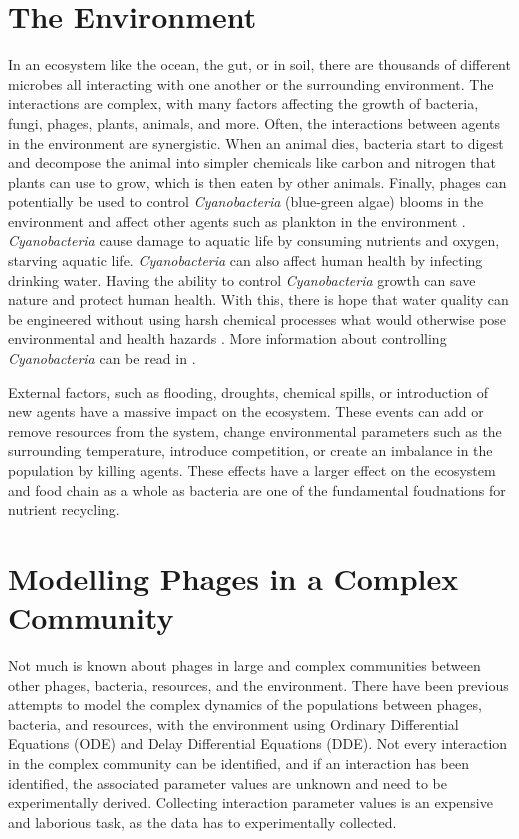 \section{The Environment}
In an ecosystem like the ocean, the gut, or in soil, there are thousands of different microbes all interacting with one another or the surrounding environment.
The interactions are complex, with many factors affecting the growth of bacteria, fungi, phages, plants, animals, and more. 
Often, the interactions between agents in the environment are synergistic. 
When an animal dies, bacteria start to digest and decompose the animal into simpler chemicals like carbon and nitrogen that plants can use to grow, which is then eaten by other animals. 
Finally, phages can potentially be used to control \textit{Cyanobacteria} (blue-green algae) blooms in the environment and affect other agents such as plankton in the environment \cite{colomaFrequencyVirusresistantHosts2019}. 
\textit{Cyanobacteria} cause damage to aquatic life by consuming nutrients and oxygen, starving aquatic life. \textit{Cyanobacteria} can also affect human health by infecting drinking water. 
Having the ability to control \textit{Cyanobacteria} growth can save nature and protect human health. 
With this, there is hope that water quality can be engineered without using harsh chemical processes what would otherwise pose environmental and health hazards \cite{tuckerIdentificationCyanophageMaLBP2005}. \newline
More information about controlling \textit{Cyanobacteria} can be read in . 

External factors, such as flooding, droughts, chemical spills, or introduction of new agents have a massive impact on the ecosystem. 
These events can add or remove resources from the system, change environmental parameters such as the surrounding temperature, introduce competition, or create an imbalance in the population by killing agents. 
These effects have a larger effect on the ecosystem and food chain as a whole as bacteria are one of the fundamental foudnations for nutrient recycling. 

\section{Modelling Phages in a Complex Community}
Not much is known about phages in large and complex communities between other phages, bacteria, resources, and the environment. 
There have been previous attempts to model the complex dynamics of the populations between phages, bacteria, and resources, with the environment using Ordinary Differential Equations (ODE) and Delay Differential Equations (DDE).
Not every interaction in the complex community can be identified, and if an interaction has been identified, the associated parameter values are unknown and need to be experimentally derived. 
Collecting interaction parameter values is an expensive and laborious task, as the data has to experimentally collected. 

